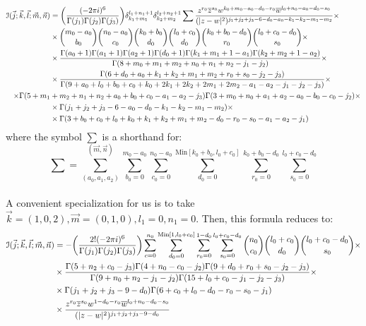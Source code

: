 \documentclass[../main.tex]{subfiles}
\begin{document}
\begingroup \allowdisplaybreaks \begin{align}
\mathcal{I}(\vec{j};\vec{k},\vec{l};\vec{m}, \vec{n}) &= \bigg(\frac{(-2 \pi i)^6}{\Gamma(j_1) \Gamma(j_2) \Gamma(j_3)} \bigg) \delta_{k_1+m_1}^{l_1+n_1+1} \delta_{k_2+m_2}^{l_2+n_2+1} \sum \frac{z^{r_0} \overline{z}^{s_0} w^{k_0+m_0-a_0-d_0-r_0} \overline{w}^{l_0+n_0-a_0-d_0-s_0}}{(\vert z-w \vert^2)^{j_1+j_2+j_3-6-d_0-a_0-k_1-k_2-m_1-m_2}} \times \notag \\
    &\times {m_0-a_0 \choose b_0} {n_0-a_0 \choose c_0} {k_0+b_0 \choose d_0} {l_0+c_0 \choose d_0} {k_0+b_0-d_0 \choose r_0} {l_0+c_0-d_0 \choose s_0}  \times \notag \\
    &\times \frac{\Gamma(a_0+1) \Gamma(a_1+1) \Gamma(a_2+1) \Gamma(d_0+1) \Gamma(k_1+m_1+1-a_1) \Gamma(k_2+m_2+1-a_2)}{\Gamma(8+m_0+m_1+m_2+n_0+n_1+n_2-j_1-j_2)} \times \notag \\
    &\times \frac{\Gamma(6+d_0+a_0+k_1+k_2+m_1+m_2+r_0+s_0-j_2-j_3)}{\Gamma(9+a_0+l_0+b_0+c_0+k_0+2k_1+2k_2+2m_1+2m_2-a_1-a_2-j_1-j_2-j_3)} \times \notag \\
    \times \Gamma(5+m_1&+m_2+n_1+n_2+a_0+b_0+c_0-a_1-a_2-j_3) \Gamma(3+m_0+n_0+a_1+a_2-a_0-b_0-c_0-j_2) \times \notag \\
    &\times \Gamma(j_1+j_2+j_3-6-a_0-d_0-k_1-k_2-m_1-m_2) \times \notag \\
    &\times \Gamma(3+b_0+c_0+l_0+k_0+k_1+k_2+m_1+m_2-d_0-r_0-s_0-a_1-a_2-j_1) \notag
\end{align} \endgroup
where the symbol $\sum$ is a shorthand for:
\begin{equation}
    \sum = \sum_{(a_0,a_1,a_2)}^{(\vec{m},\vec{n})} \sum_{b_0=0}^{m_0-a_0} \sum_{c_0=0}^{n_0-a_0} \overset{\text{Min}[k_0+b_0,l_0+c_0]}{\sum_{d_0=0}} \sum_{r_0=0}^{k_0+b_0-d_0} \sum_{s_0=0}^{l_0+c_0-d_0} 
\end{equation}
\\
A convenient specialization for us is to take $\vec{k} = (1,0,2),\vec{m}=(0,1,0),l_1=0,n_1=0$. Then, this formula reduces to:
\begingroup \allowdisplaybreaks \begin{align} 
\mathcal{I}(\vec{j};\vec{k},\vec{l};\vec{m}, \vec{n}) &= - \bigg(\frac{2! (-2 \pi i)^6}{\Gamma(j_1) \Gamma(j_2) \Gamma(j_3)} \bigg)\sum_{c=0}^{n_0} \overset{\text{Min}[1,l_0+c_0]}{\sum_{d_0=0}}  \sum_{r_0=0}^{1-d_0} \sum_{s_0=0}^{l_0+c_0-d_0} {n_0 \choose c_0} {l_0+c_0 \choose d_0} {l_0+c_0-d_0 \choose s_0} \times \label{eq: simplified general result} \\
&\times \frac{\Gamma(5+n_2+c_0-j_3) \Gamma(4+n_0-c_0-j_2) \Gamma(9+d_0+r_0+s_0-j_2-j_3)}{\Gamma(9+n_0+n_2-j_1-j_2) \Gamma(15+l_0+c_0-j_1-j_2-j_3)} \times \notag \\
&\times \Gamma(j_1+j_2+j_3-9-d_0) \Gamma(6+c_0+l_0-d_0-r_0-s_0-j_1) \notag \\
&\times \frac{z^{r_0} \overline{z}^{s_0} w^{1-d_0-r_0} \overline{w}^{l_0+n_0-d_0-s_0}}{(\vert z-w \vert^2)^{j_1+j_2+j_3-9-d_0}} \notag 
\end{align}\endgroup
%
\end{document}
